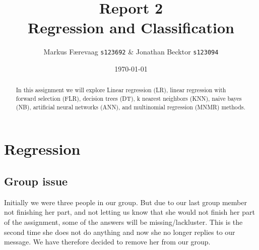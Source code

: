 \documentclass[11pt, paper=a4]{article}
\begin{document}

\title{{Report 2}\\{\bf Regression and Classification}}

\author{Markus Færevaag {\tt s123692} \& Jonathan Becktor {\tt s123094}}

\date{\today}

\maketitle

\begin{abstract}
  In this assignment we will explore Linear regression (LR), linear
  regression with forward selection (FLR), decision trees (DT), k
  nearest neighbors (KNN), naive bayes (NB), artificial neural networks
  (ANN), and multinomial regression (MNMR) methods.


\end{abstract}

\section{Regression}
\label{sec:regression}
\subsection{Group issue}
Initially we were three people in our group. But due to our last group
member not finishing her part, and not letting us know that she would not
finish her part of the assignment, some of the answers will be
missing/lackluster. This is the second time she does not do
anything and now she no longer replies to our message. We have
therefore decided to remove her from our group.
\end{document}
